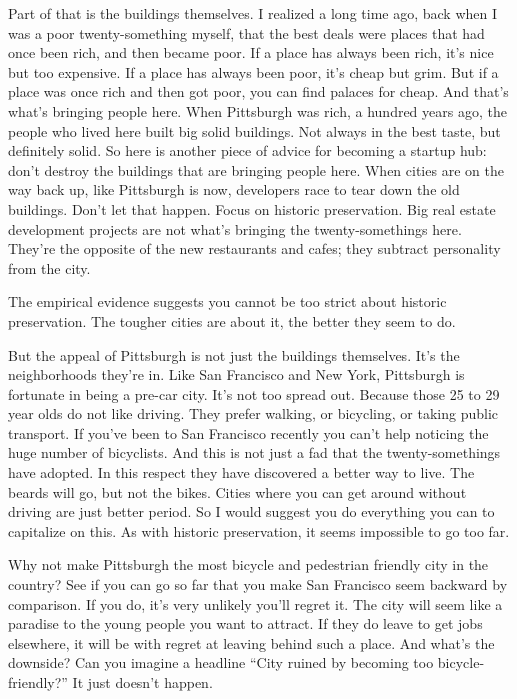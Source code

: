 Part of that is the buildings themselves. I realized a long time ago,
back when I was a poor twenty-something myself, that the best deals were
places that had once been rich, and then became poor. If a place has
always been rich, it's nice but too expensive. If a place has always
been poor, it's cheap but grim. But if a place was once rich and then
got poor, you can find palaces for cheap. And that's what's bringing
people here. When Pittsburgh was rich, a hundred years ago, the people
who lived here built big solid buildings. Not always in the best taste,
but definitely solid. So here is another piece of advice for becoming a
startup hub: don't destroy the buildings that are bringing people here.
When cities are on the way back up, like Pittsburgh is now, developers
race to tear down the old buildings. Don't let that happen. Focus on
historic preservation. Big real estate development projects are not
what's bringing the twenty-somethings here. They're the opposite of the
new restaurants and cafes; they subtract personality from the city.

The empirical evidence suggests you cannot be too strict about historic
preservation. The tougher cities are about it, the better they seem to
do.

But the appeal of Pittsburgh is not just the buildings themselves. It's
the neighborhoods they're in. Like San Francisco and New York,
Pittsburgh is fortunate in being a pre-car city. It's not too spread
out. Because those 25 to 29 year olds do not like driving. They prefer
walking, or bicycling, or taking public transport. If you've been to San
Francisco recently you can't help noticing the huge number of
bicyclists. And this is not just a fad that the twenty-somethings have
adopted. In this respect they have discovered a better way to live. The
beards will go, but not the bikes. Cities where you can get around
without driving are just better period. So I would suggest you do
everything you can to capitalize on this. As with historic preservation,
it seems impossible to go too far.

Why not make Pittsburgh the most bicycle and pedestrian friendly city in
the country? See if you can go so far that you make San Francisco seem
backward by comparison. If you do, it's very unlikely you'll regret it.
The city will seem like a paradise to the young people you want to
attract. If they do leave to get jobs elsewhere, it will be with regret
at leaving behind such a place. And what's the downside? Can you imagine
a headline ``City ruined by becoming too bicycle-friendly?'' It just
doesn't happen.

